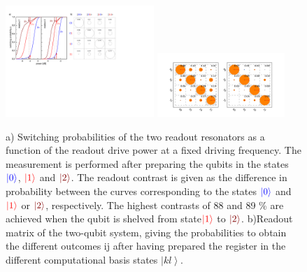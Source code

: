 %
\begin{figure}[ht!]
 \centering \includegraphics[width=0.5\textwidth]{"./material/papers/grover/figures/s curves"}
\includegraphics[width=0.43\textwidth]{"./data/ct5/2011_04_21 - grover and tomo/good_data/readout only"}
\caption[Switching probabilities of the two qubit readouts as a function of
the readout excitation power]{a) Switching probabilities of the two readout resonators
as a function of the readout drive power at a fixed driving frequency.
The measurement is performed after preparing the qubits in the states
${\color{blue}{\left| 0 \right>}}$, ${\color{red}{\left| 1 \right>}}$ and ${\color{brown}{\ket{2}}}$.
The readout contrast is given as the difference in probability between
the curves corresponding to the states ${\color{blue}{\left| 0 \right>}}$
and ${\color{red}{\left| 1 \right>}}$ or ${\color{brown}{\ket{2}}}$, respectively.
The highest contrasts of 88 and 89 \% are achieved when the qubit
is shelved from state${\color{red}{\left| 1 \right>}}$ to ${\color{brown}{\ket{2}}}$.
b)Readout matrix of the two-qubit system, giving
the probabilities to obtain the different outcomes ij after having
prepared the register in the different computational basis states
$\left|kl\right\rangle $.}


\label{fig:qubit_readout_characteristics} %
\end{figure}



